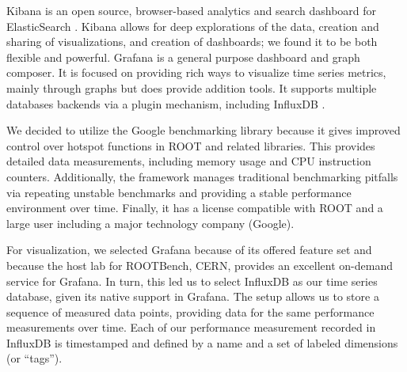 \documentclass{webofc}
\begin{document}
Kibana is an open source, browser-based analytics and search dashboard for ElasticSearch \cite{elasticsearch}. Kibana allows for deep explorations of the data, creation and sharing of visualizations, and creation of dashboards; we found it to be both flexible and powerful. Grafana is a general purpose dashboard and graph composer. It is focused on providing rich ways to visualize time series metrics, mainly through graphs but does provide addition tools. It supports multiple databases backends via a plugin mechanism, including InfluxDB \cite{influxdb}.

We decided to utilize the Google benchmarking library because it gives improved control over hotspot functions in ROOT and related libraries. This provides detailed data measurements, including memory usage and CPU instruction counters. Additionally, the framework manages traditional benchmarking pitfalls via repeating unstable benchmarks and providing a stable performance environment over time. Finally, it has a license compatible with ROOT and a large user including a major technology company (Google).

For visualization, we selected Grafana because of its offered feature set and because the host lab for ROOTBench, CERN, provides an excellent on-demand service for Grafana. In turn, this led us to select InfluxDB as our time series database, given its native support in Grafana. The setup allows us to store a sequence of measured data points, providing data for the same performance measurements over time. Each of our performance measurement recorded in InfluxDB is timestamped and defined by a name and a set of labeled dimensions (or “tags”).


\end{document}
